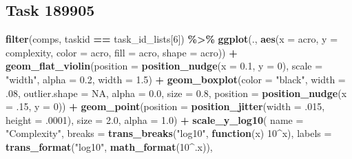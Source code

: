 \documentclass[
]{book}
\newenvironment{Shaded}{\begin{snugshade}}{\end{snugshade}}
\newcommand{\AttributeTok}[1]{\textcolor[rgb]{0.13,0.29,0.53}{#1}}
\newcommand{\ConstantTok}[1]{\textcolor[rgb]{0.56,0.35,0.01}{#1}}
\newcommand{\ControlFlowTok}[1]{\textcolor[rgb]{0.13,0.29,0.53}{\textbf{#1}}}
\newcommand{\DecValTok}[1]{\textcolor[rgb]{0.00,0.00,0.81}{#1}}
\newcommand{\FloatTok}[1]{\textcolor[rgb]{0.00,0.00,0.81}{#1}}
\newcommand{\FunctionTok}[1]{\textcolor[rgb]{0.13,0.29,0.53}{\textbf{#1}}}
\newcommand{\NormalTok}[1]{#1}
\newcommand{\SpecialCharTok}[1]{\textcolor[rgb]{0.81,0.36,0.00}{\textbf{#1}}}
\newcommand{\StringTok}[1]{\textcolor[rgb]{0.31,0.60,0.02}{#1}}
\begin{document}
\hypertarget{task-189905-1}{%
\subsection{Task 189905}\label{task-189905-1}}

\begin{Shaded}
\begin{Highlighting}[]
\FunctionTok{filter}\NormalTok{(comps, taskid }\SpecialCharTok{==}\NormalTok{ task\_id\_lists[}\DecValTok{6}\NormalTok{]) }\SpecialCharTok{\%\textgreater{}\%}
  \FunctionTok{ggplot}\NormalTok{(., }\FunctionTok{aes}\NormalTok{(}\AttributeTok{x =}\NormalTok{ acro, }\AttributeTok{y =}\NormalTok{ complexity, }\AttributeTok{color =}\NormalTok{ acro,}
                \AttributeTok{fill =}\NormalTok{ acro, }\AttributeTok{shape =}\NormalTok{ acro)) }\SpecialCharTok{+}
  \FunctionTok{geom\_flat\_violin}\NormalTok{(}\AttributeTok{position =} \FunctionTok{position\_nudge}\NormalTok{(}\AttributeTok{x =} \FloatTok{0.1}\NormalTok{, }\AttributeTok{y =} \DecValTok{0}\NormalTok{),}
                   \AttributeTok{scale =} \StringTok{"width"}\NormalTok{, }\AttributeTok{alpha =} \FloatTok{0.2}\NormalTok{, }\AttributeTok{width =} \FloatTok{1.5}\NormalTok{) }\SpecialCharTok{+}
  \FunctionTok{geom\_boxplot}\NormalTok{(}\AttributeTok{color =} \StringTok{"black"}\NormalTok{, }\AttributeTok{width =}\NormalTok{ .}\DecValTok{08}\NormalTok{, }\AttributeTok{outlier.shape =} \ConstantTok{NA}\NormalTok{, }\AttributeTok{alpha =} \FloatTok{0.0}\NormalTok{,}
               \AttributeTok{size =} \FloatTok{0.8}\NormalTok{, }\AttributeTok{position =} \FunctionTok{position\_nudge}\NormalTok{(}\AttributeTok{x =}\NormalTok{ .}\DecValTok{15}\NormalTok{, }\AttributeTok{y =} \DecValTok{0}\NormalTok{)) }\SpecialCharTok{+}
  \FunctionTok{geom\_point}\NormalTok{(}\AttributeTok{position =} \FunctionTok{position\_jitter}\NormalTok{(}\AttributeTok{width =}\NormalTok{ .}\DecValTok{015}\NormalTok{, }\AttributeTok{height =}\NormalTok{ .}\DecValTok{0001}\NormalTok{),}
             \AttributeTok{size =} \FloatTok{2.0}\NormalTok{, }\AttributeTok{alpha =} \FloatTok{1.0}\NormalTok{) }\SpecialCharTok{+}
  \FunctionTok{scale\_y\_log10}\NormalTok{(}
    \AttributeTok{name =} \StringTok{"Complexity"}\NormalTok{,}
    \AttributeTok{breaks =} \FunctionTok{trans\_breaks}\NormalTok{(}\StringTok{"log10"}\NormalTok{, }\ControlFlowTok{function}\NormalTok{(x) }\DecValTok{10}\SpecialCharTok{\^{}}\NormalTok{x),}
    \AttributeTok{labels =} \FunctionTok{trans\_format}\NormalTok{(}\StringTok{"log10"}\NormalTok{, }\FunctionTok{math\_format}\NormalTok{(}\DecValTok{10}\SpecialCharTok{\^{}}\NormalTok{.x)),}


\end{Highlighting}
\end{Shaded}
\end{document}
